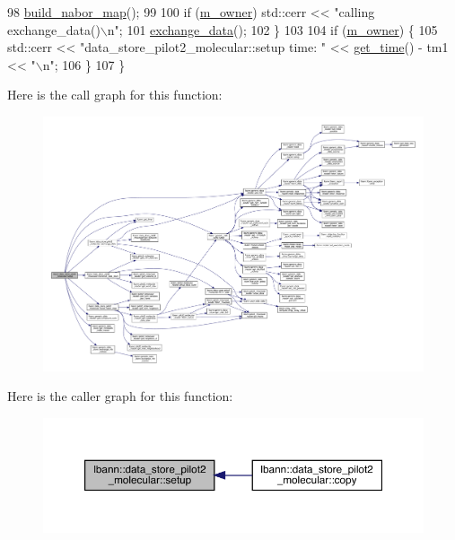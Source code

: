 \begin{DoxyCode}
98     \hyperlink{classlbann_1_1data__store__pilot2__molecular_af70726cfb8377832ce457d9b874bf34e}{build\_nabor\_map}();
99 
100     \textcolor{keywordflow}{if} (\hyperlink{classlbann_1_1data__store__pilot2__molecular_a9229deea455ef0a68508e6b956887dd3}{m\_owner}) std::cerr << \textcolor{stringliteral}{"calling exchange\_data()\(\backslash\)n"};
101     \hyperlink{classlbann_1_1data__store__pilot2__molecular_addaa6db4e1b3a25424da9da63c0b3616}{exchange\_data}();
102   \}
103 
104   \textcolor{keywordflow}{if} (\hyperlink{classlbann_1_1data__store__pilot2__molecular_a9229deea455ef0a68508e6b956887dd3}{m\_owner}) \{
105     std::cerr << \textcolor{stringliteral}{"data\_store\_pilot2\_molecular::setup time: "} << \hyperlink{namespacelbann_a478d36031ff0659893c4322cd856157f}{get\_time}() - tm1 << \textcolor{stringliteral}{"\(\backslash\)n"};
106   \}
107 \}
\end{DoxyCode}
Here is the call graph for this function\+:\nopagebreak
\begin{figure}[H]
\begin{center}
\leavevmode
\includegraphics[width=350pt]{classlbann_1_1data__store__pilot2__molecular_a975d7907053a8b2e92ea5f77ca4ae7a3_cgraph}
\end{center}
\end{figure}
Here is the caller graph for this function\+:\nopagebreak
\begin{figure}[H]
\begin{center}
\leavevmode
\includegraphics[width=350pt]{classlbann_1_1data__store__pilot2__molecular_a975d7907053a8b2e92ea5f77ca4ae7a3_icgraph}
\end{center}
\end{figure}


